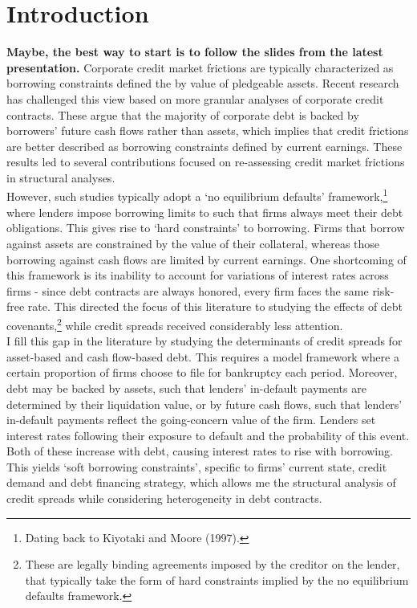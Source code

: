 \documentclass[12pt]{article}
\begin{document}
\section{Introduction \label{sec:introduction}} 
\textbf{Maybe, the best way to start is to follow the slides from the latest presentation.} Corporate credit market frictions are typically characterized as borrowing constraints defined the by value of pledgeable assets. Recent research has challenged this view based on more granular analyses of corporate credit contracts. These argue that the majority of corporate debt is backed by borrowers’ future cash flows rather than assets, which implies that credit frictions are better described as borrowing constraints defined by current earnings. These results led to several contributions focused on re-assessing credit market frictions in structural analyses. \vspace{3mm} \\
However, such studies typically adopt a `no equilibrium defaults' framework,\footnote{Dating back to Kiyotaki and Moore (1997).} where lenders impose borrowing limits to such that firms always meet their debt obligations. This gives rise to `hard constraints' to borrowing. Firms that borrow against assets are constrained by the value of their collateral, whereas those borrowing against cash flows are limited by current earnings. One shortcoming of this framework is its inability to account for variations of interest rates across firms - since debt contracts are always honored, every firm faces the same risk-free rate. This directed the focus of this literature to studying the effects of debt covenants,\footnote{These are legally binding agreements imposed by the creditor on the lender, that typically take the form of hard constraints implied by the no equilibrium defaults framework.} while credit spreads received considerably less attention.  \vspace*{3mm} \\
I fill this gap in the literature by studying the determinants of credit spreads for asset-based and cash flow-based debt. This requires a model framework where a certain proportion of firms choose to file for bankruptcy each period. Moreover, debt may be backed by assets, such that lenders' in-default payments are determined by their liquidation value, or by future cash flows, such that lenders' in-default payments reflect the going-concern value of the firm. Lenders set interest rates following their exposure to default and the probability of this event. Both of these increase with debt, causing interest rates to rise with borrowing. This yields `soft borrowing constraints', specific to firms' current state, credit demand and debt financing strategy, which allows me the structural analysis of credit spreads while considering heterogeneity in debt contracts. \vspace*{3mm} \\
\end{document}
